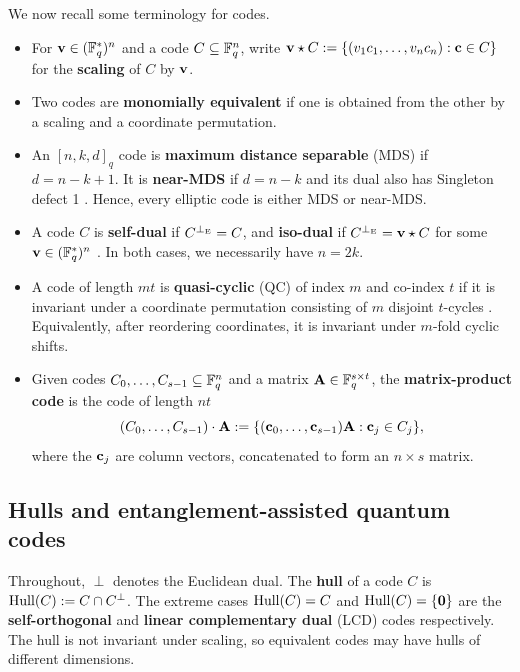 \documentclass[twocolumn, 11pt]{scrartcl}
\begin{document}
We now recall some terminology for codes.
\begin{itemize}
    \item For $\mathbf{v}\in(\mathbb{F}_q^*)^n$ and a code $C\subseteq\mathbb{F}_q^n$, write $\mathbf{v}\star C:=\{(v_1c_1,\hdots,v_nc_n):\mathbf{c}\in C\}$ for the \textbf{scaling} of $C$ by $\mathbf{v}$.
    \item Two codes are \textbf{monomially equivalent} if one is obtained from the other by a scaling and a coordinate permutation.
    \item An $[n,k,d]_q$ code is \textbf{maximum distance separable} (MDS) if $d=n-k+1$. It is \textbf{near-MDS} if $d=n-k$ and its dual also has Singleton defect 1 \cite{dodunekov1995near}. Hence, every elliptic code is either MDS or near-MDS.
    \item A code $C$ is \textbf{self-dual} if $C^{\perp_\mathrm{E}}=C$, and \textbf{iso-dual} if $C^{\perp_\mathrm{E}}=\mathbf{v}\star C$ for some $\mathbf{v}\in(\mathbb{F}_q^*)^n$ \cite{jin2019selfdual,zhu2026isodual}. In both cases, we necessarily have $n=2k$.
    \item A code of length $mt$ is \textbf{quasi-cyclic} (QC) of index $m$ and co-index $t$ if it is invariant under a coordinate permutation consisting of $m$ disjoint $t$-cycles \cite{ling2001algebraic,tong2013quasicyclic}. Equivalently, after reordering coordinates, it is invariant under $m$-fold cyclic shifts.
    \item Given codes $C_0,\hdots,C_{s-1}\subseteq\mathbb{F}_q^n$ and a matrix $\mathbf{A}\in\mathbb{F}_q^{s\times t}$, the \textbf{matrix-product code} \cite{blackmore2001matrix} is the code of length $nt$
    \[ (C_0,\hdots,C_{s-1})\cdot\bfA:=\set*{(\bfc_0,\hdots,\bfc_{s-1})\bfA:\bfc_j\in C_j}, \]
    where the $\mathbf{c}_j$ are column vectors, concatenated to form an $n\times s$ matrix.
\end{itemize}

\subsection{Hulls and entanglement-assisted quantum codes} \label{section:hulls-background}

Throughout, $\perp$ denotes the Euclidean dual. The \textbf{hull} of a code $C$ is $\operatorname{Hull}(C):=C\cap C^\perp$. The extreme cases $\operatorname{Hull}(C)=C$ and $\operatorname{Hull}(C)=\{\mathbf0\}$ are the \textbf{self-orthogonal} and \textbf{linear complementary dual} (LCD) codes respectively. The hull is not invariant under scaling, so equivalent codes may have hulls of different dimensions.
\end{document}
